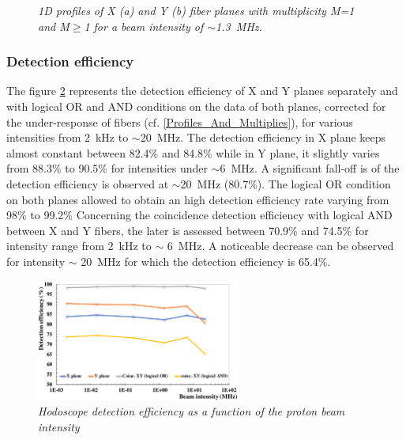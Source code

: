 \documentclass[a4paper,11pt]{article}
\begin{document}
\begin{figure}[H]
\begin{subfigure}{0.47\textwidth}
    \end{subfigure}
\caption{\small{\textit{1D profiles of X (a) and Y (b) fiber planes with multiplicity M=1 and M$\geq$1 for a beam intensity of $\sim${1.3}~MHz.}}}
\label{fig:1D_Profiles}
\end{figure}


\subsubsection{Detection efficiency}

The figure \ref{fig:DE} represents the detection efficiency of X and Y planes separately and with logical OR and AND conditions on the data of both planes, corrected for the under-response of fibers (cf. \ref{Profiles_And_Multiplies}), for various intensities from 2~kHz to $\sim$20~MHz.
The detection efficiency in X plane keeps almost constant between 82.4\% and 84.8\% while in Y plane, it slightly varies from 88.3\% to 90.5\% for intensities under $\sim$6~MHz. A significant fall-off is of the detection efficiency is observed at $\sim$20~MHz (80.7\%). The logical OR condition on both planes allowed to obtain an high detection efficiency rate varying from 98\% to 99.2\%
Concerning the coincidence detection efficiency with logical AND between X and Y fibers, the later is assessed between 70.9\% and 74.5\% for intensity range from 2~kHz to $\sim$ 6~MHz. A noticeable decrease can be observed for intensity $\sim$ 20~MHz for which the detection efficiency is 65.4\%.

\begin{figure}[H]
\centering
\includegraphics[width=0.6\textwidth]{figures/DE_March_2019_corr.pdf}
\caption{\small{\textit{Hodoscope  detection  efficiency  as  a  function  of  the proton beam intensity}}}
\label{fig:DE}
\end{figure}
\end{document}
